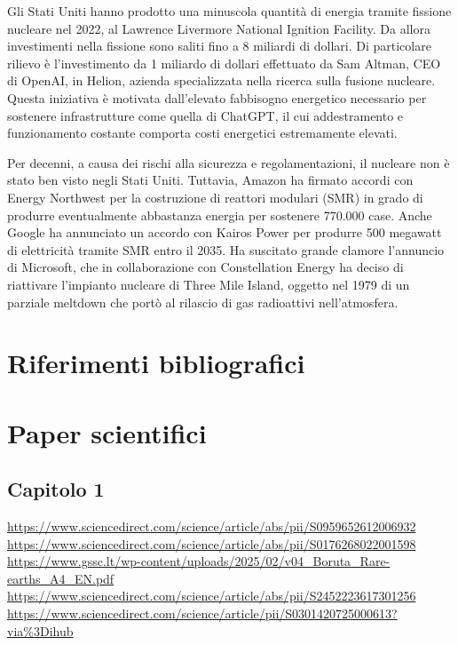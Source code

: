 \documentclass[12pt,a4paper,oneside]{book}
\begin{document}
Gli Stati Uniti hanno prodotto una minuscola quantità di energia tramite fissione nucleare nel 2022, al Lawrence Livermore National Ignition Facility. Da allora investimenti nella fissione sono saliti fino a 8 miliardi di dollari. Di particolare rilievo è l'investimento da 1 miliardo di dollari effettuato da Sam Altman, CEO di OpenAI, in Helion, azienda specializzata nella ricerca sulla fusione nucleare. Questa iniziativa è motivata dall'elevato fabbisogno energetico necessario per sostenere infrastrutture come quella di ChatGPT, il cui addestramento e funzionamento costante comporta costi energetici estremamente elevati.

Per decenni, a causa dei rischi alla sicurezza e regolamentazioni, il nucleare non è stato ben visto negli Stati Uniti. Tuttavia, Amazon ha firmato accordi con Energy Northwest per la costruzione di reattori modulari (SMR) in grado di produrre eventualmente abbastanza energia per sostenere 770.000 case. Anche Google ha annunciato un accordo con Kairos Power per produrre 500 megawatt di elettricità tramite SMR entro il 2035.
Ha suscitato grande clamore l'annuncio di Microsoft, che in collaborazione con Constellation Energy ha deciso di riattivare l'impianto nucleare di Three Mile Island, oggetto nel 1979 di un parziale meltdown che portò al rilascio di gas radioattivi nell'atmosfera.


\newpage
\renewcommand{\bibsection}{}
\section*{Riferimenti bibliografici}
\nocite{*}

\section*{Paper scientifici}
\subsection*{Capitolo 1}
\sloppy          %

\url{https://www.sciencedirect.com/science/article/abs/pii/S0959652612006932} \\
\url{https://www.sciencedirect.com/science/article/abs/pii/S0176268022001598} \\
\url{https://www.gssc.lt/wp-content/uploads/2025/02/v04_Boruta_Rare-earths_A4_EN.pdf} \\
\url{https://www.sciencedirect.com/science/article/abs/pii/S2452223617301256} \\
\url{https://www.sciencedirect.com/science/article/pii/S0301420725000613?via%3Dihub}
\end{document}
